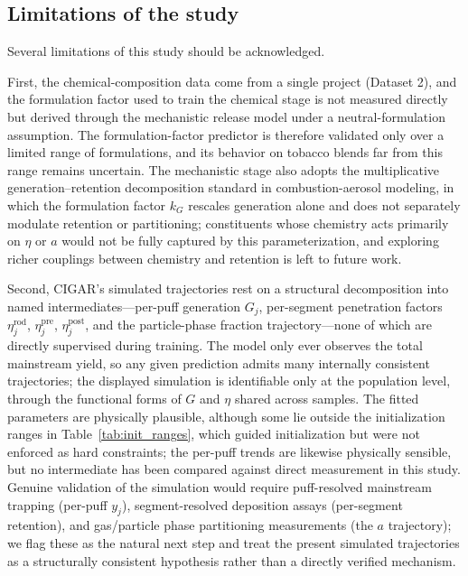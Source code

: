 ﻿\documentclass[a4paper,fleqn]{cas-sc}
\begin{document}
\subsection{Limitations of the study}

Several limitations of this study should be acknowledged.

First, the chemical-composition data come from a single project (Dataset 2), and the formulation factor used to train the chemical stage is not measured directly but derived through the mechanistic release model under a neutral-formulation assumption. The formulation-factor predictor is therefore validated only over a limited range of formulations, and its behavior on tobacco blends far from this range remains uncertain. The mechanistic stage also adopts the multiplicative generation--retention decomposition standard in combustion-aerosol modeling, in which the formulation factor $k_G$ rescales generation alone and does not separately modulate retention or partitioning; constituents whose chemistry acts primarily on $\eta$ or $a$ would not be fully captured by this parameterization, and exploring richer couplings between chemistry and retention is left to future work.

Second, CIGAR's simulated trajectories rest on a structural decomposition into named intermediates---per-puff generation $G_j$, per-segment penetration factors $\eta^{\mathrm{rod}}_j$, $\eta^{\mathrm{pre}}_j$, $\eta^{\mathrm{post}}_j$, and the particle-phase fraction trajectory---none of which are directly supervised during training. The model only ever observes the total mainstream yield, so any given prediction admits many internally consistent trajectories; the displayed simulation is identifiable only at the population level, through the functional forms of $G$ and $\eta$ shared across samples. The fitted parameters are physically plausible, although some lie outside the initialization ranges in Table~\ref{tab:init_ranges}, which guided initialization but were not enforced as hard constraints; the per-puff trends are likewise physically sensible, but no intermediate has been compared against direct measurement in this study. Genuine validation of the simulation would require puff-resolved mainstream trapping (per-puff $y_j$), segment-resolved deposition assays (per-segment retention), and gas/particle phase partitioning measurements (the $a$ trajectory); we flag these as the natural next step and treat the present simulated trajectories as a structurally consistent hypothesis rather than a directly verified mechanism.
\end{document}
